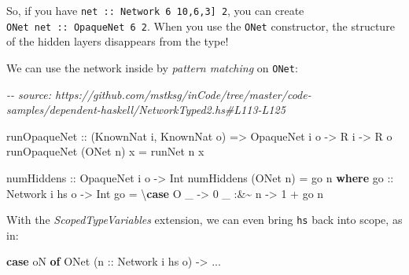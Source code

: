 \documentclass[]{article}
\newenvironment{Shaded}{}{}
\newcommand{\CommentTok}[1]{\textcolor[rgb]{0.38,0.63,0.69}{\textit{#1}}}
\newcommand{\DataTypeTok}[1]{\textcolor[rgb]{0.56,0.13,0.00}{#1}}
\newcommand{\DecValTok}[1]{\textcolor[rgb]{0.25,0.63,0.44}{#1}}
\newcommand{\KeywordTok}[1]{\textcolor[rgb]{0.00,0.44,0.13}{\textbf{#1}}}
\newcommand{\NormalTok}[1]{#1}
\newcommand{\OperatorTok}[1]{\textcolor[rgb]{0.40,0.40,0.40}{#1}}
\newcommand{\OtherTok}[1]{\textcolor[rgb]{0.00,0.44,0.13}{#1}}
\begin{document}
So, if you have \texttt{net\ ::\ Network\ 6\ \textquotesingle{}{[}10,6,3{]}\ 2},
you can create \texttt{ONet\ net\ ::\ OpaqueNet\ 6\ 2}. When you use the
\texttt{ONet} constructor, the structure of the hidden layers disappears from
the type!

We can use the network inside by \emph{pattern matching} on \texttt{ONet}:

\begin{Shaded}
\begin{Highlighting}[]
\CommentTok{{-}{-} source: https://github.com/mstksg/inCode/tree/master/code{-}samples/dependent{-}haskell/NetworkTyped2.hs\#L113{-}L125}

\OtherTok{runOpaqueNet ::}\NormalTok{ (}\DataTypeTok{KnownNat}\NormalTok{ i, }\DataTypeTok{KnownNat}\NormalTok{ o)}
             \OtherTok{=\textgreater{}} \DataTypeTok{OpaqueNet}\NormalTok{ i o}
             \OtherTok{{-}\textgreater{}} \DataTypeTok{R}\NormalTok{ i}
             \OtherTok{{-}\textgreater{}} \DataTypeTok{R}\NormalTok{ o}
\NormalTok{runOpaqueNet (}\DataTypeTok{ONet}\NormalTok{ n) x }\OtherTok{=}\NormalTok{ runNet n x}

\OtherTok{numHiddens ::} \DataTypeTok{OpaqueNet}\NormalTok{ i o }\OtherTok{{-}\textgreater{}} \DataTypeTok{Int}
\NormalTok{numHiddens (}\DataTypeTok{ONet}\NormalTok{ n) }\OtherTok{=}\NormalTok{ go n}
  \KeywordTok{where}
\OtherTok{    go ::} \DataTypeTok{Network}\NormalTok{ i hs o }\OtherTok{{-}\textgreater{}} \DataTypeTok{Int}
\NormalTok{    go }\OtherTok{=}\NormalTok{ \textbackslash{}}\KeywordTok{case}
        \DataTypeTok{O}\NormalTok{ \_      }\OtherTok{{-}\textgreater{}} \DecValTok{0}
\NormalTok{        \_ }\OperatorTok{:\&\textasciitilde{}}\NormalTok{ n\textquotesingle{} }\OtherTok{{-}\textgreater{}} \DecValTok{1} \OperatorTok{+}\NormalTok{ go n\textquotesingle{}}
\end{Highlighting}
\end{Shaded}

With the \emph{ScopedTypeVariables} extension, we can even bring \texttt{hs}
back into scope, as in:

\begin{Shaded}
\begin{Highlighting}[]
\KeywordTok{case}\NormalTok{ oN }\KeywordTok{of}
  \DataTypeTok{ONet}\NormalTok{ (}\OtherTok{n ::} \DataTypeTok{Network}\NormalTok{ i hs o) }\OtherTok{{-}\textgreater{}} \OperatorTok{...}
\end{Highlighting}
\end{Shaded}
\end{document}
